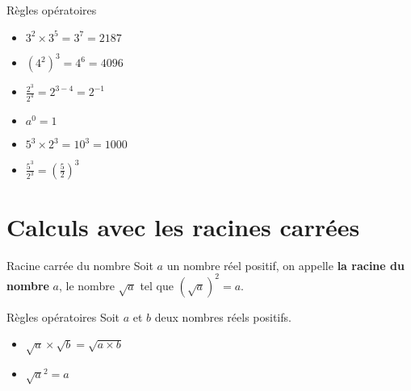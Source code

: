 \begin{pageCours}
\begin{ThT}{Règles opératoires}
\end{ThT}
 

 
 
\begin{Ex}

\begin{minipage}{0.33\linewidth}
\begin{itemize}
\item $3^2 \times 3^5 = 3^{7}=2187$ 
\item $\left(4^2 \right)^3 =4^6=4096$ 

\end{itemize}
\end{minipage}
\begin{minipage}{0.33\linewidth}
\begin{itemize}
\item $\frac{2^3}{2^4} =  2^{3-4} =  2^{-1}$ 
\item $a^0=1 $
 
\end{itemize}
\end{minipage}
\begin{minipage}{0.33\linewidth}
\begin{itemize}
\item $5^3 \times 2^3 = 10^3=1000$ 
\item $\frac{5^3}{2^3} = \left( \frac{5}{2} \right)^3 $ 
\end{itemize}
\end{minipage}

\end{Ex}
 
 
 

\section{Calculs avec les racines carrées}

\begin{DefT}{Racine carrée du nombre}
Soit $a$ un nombre réel positif, on appelle \textbf{la racine du nombre} $a$, le nombre $\sqrt a$ tel que $\left( \sqrt a \right)^2=a$.
\end{DefT}




\begin{ThT}{Règles opératoires}
Soit $a$ et $b$ deux nombres réels positifs.


\begin{minipage}{0.33\linewidth}
\begin{itemize}
\item $\sqrt a  \times \sqrt b = \sqrt{a\times b}$ 
\item $\sqrt a^2 = a$ 


\end{itemize}
\end{minipage}
\end{ThT}
\end{pageCours}
